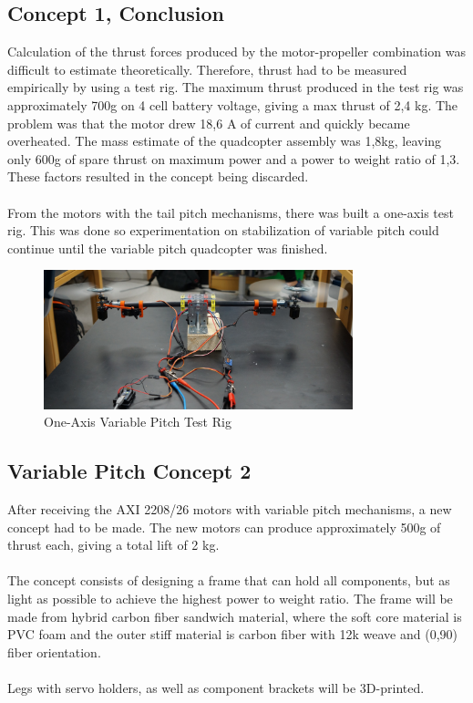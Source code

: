 \subsection{Concept 1, Conclusion}

Calculation of the thrust forces produced by the motor-propeller combination was difficult to estimate theoretically. Therefore, thrust had to be measured empirically by using a test rig. The maximum thrust produced in the test rig was approximately 700g on 4 cell battery voltage, giving a max thrust of 2,4 kg. The problem was that the motor drew 18,6 A of current and quickly became overheated. The mass estimate of the quadcopter assembly was 1,8kg, leaving only 600g of spare thrust on maximum power and a power to weight ratio of 1,3. These factors resulted in the concept being discarded.
\\\\
From the motors with the tail pitch mechanisms, there was built a one-axis test rig. This was done so experimentation on stabilization of variable pitch could continue until the variable pitch quadcopter was finished. 

\begin{figure}[H]
    \centering
         \includegraphics[width = 0.8\textwidth]{VAPIQ-PICTURES/VPQ_rainbow_Rig.jpg}
      \caption{One-Axis Variable Pitch Test Rig}
\end{figure} 



\subsection{Variable Pitch Concept 2}

After receiving the AXI 2208/26 motors with variable pitch mechanisms, a new concept had to be made. The new motors can produce approximately 500g of thrust each, giving a total lift of 2 kg.
\\\\
The concept consists of designing a frame that can hold all components, but as light as possible to achieve the highest power to weight ratio. The frame will be made from hybrid carbon fiber sandwich material, where the soft core material is PVC foam and the outer stiff material is carbon fiber with 12k weave and (0,90) fiber orientation.
\\\\
Legs with servo holders, as well as component brackets will be 3D-printed.

